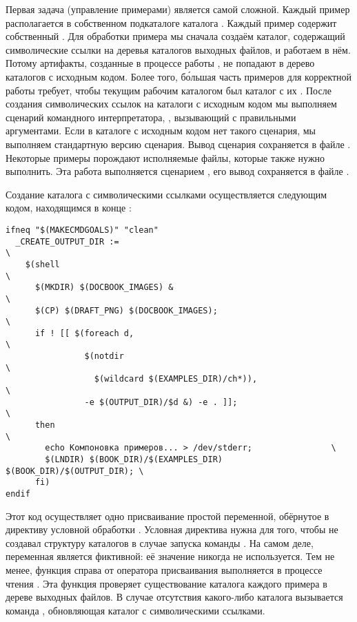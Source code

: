 Первая задача (управление примерами) является самой сложной. Каждый
пример располагается в собственном подкаталоге каталога
. Каждый пример содержит
собственный \Makefile{}. Для обработки примера мы сначала создаём
каталог, содержащий символические ссылки на деревья каталогов выходных
файлов, и работаем в нём. Потому артифакты, созданные в процессе
работы \GNUmake{}, не попадают в дерево каталогов с исходным
кодом. Более того, б\'{о}льшая часть примеров для корректной работы
требует, чтобы текущим рабочим каталогом был каталог с их
. После создания символических ссылок на каталоги с
исходным кодом мы выполняем сценарий командного интерпретатора,
, вызывающий \Makefile{} с правильными
аргументами. Если в каталоге с исходным кодом нет такого сценария, мы
выполняем стандартную версию сценария. Вывод сценария
 сохраняется в файле . Некоторые
примеры порождают исполняемые файлы, которые также нужно
выполнить. Эта работа выполняется сценарием , его
вывод сохраняется в файле .

Создание каталога с символическими ссылками осуществляется следующим
кодом, находящимся в конце :

\begin{verbatim}
ifneq "$(MAKECMDGOALS)" "clean"
  _CREATE_OUTPUT_DIR :=                                                 \
    $(shell                                                             \
      $(MKDIR) $(DOCBOOK_IMAGES) &                                      \
      $(CP) $(DRAFT_PNG) $(DOCBOOK_IMAGES);                             \
      if ! [[ $(foreach d,                                              \
                $(notdir                                                \
                  $(wildcard $(EXAMPLES_DIR)/ch*)),                     \
                -e $(OUTPUT_DIR)/$d &) -e . ]];                         \
      then                                                              \
        echo Компоновка примеров... > /dev/stderr;                \
        $(LNDIR) $(BOOK_DIR)/$(EXAMPLES_DIR) $(BOOK_DIR)/$(OUTPUT_DIR); \
      fi)
endif
\end{verbatim}

Этот код осуществляет одно присваивание простой переменной, обёрнутое
в директиву условной обработки \directive{ifneq}. Условная директива
нужна для того, чтобы \GNUmake{} не создавал структуру каталогов в
случае запуска команды \command{make clean}. На самом деле, переменная
является фиктивной: её значение никогда не используется. Тем не менее,
функция \function{shell} справа от оператора присваивания выполняется
в процессе чтения \makefile{а}. Эта функция проверяет существование
каталога каждого примера в дереве выходных файлов. В случае отсутствия
какого-либо каталога вызывается команда , обновляющая
каталог с символическими ссылками.

